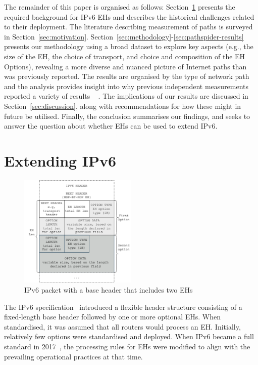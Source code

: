 \documentclass[conference]{IEEEtran}
\begin{document}
The remainder of this paper is organised as follows:
Section~\ref{sec:background} presents the required background for IPv6 EHs and
describes the historical challenges related to their deployment.  The
literature describing measurement of paths is surveyed in
Section~\ref{sec:motivation}.
Section~\ref{sec:methodology}-\ref{sec:pathspider-results} presents our
methodology using a broad dataset to explore key aspects (e.g., the size of the
EH, the choice of transport, and choice and composition of the EH Options),
revealing a more diverse and nuanced picture of Internet paths than was
previously reported. The results are organised by the type of network path and
the analysis provides insight into why previous independent measurements
reported a variety of results ~\cite{RFC7872} \cite{apnic}
\cite{nalini-iepg114} \cite{james}.  The implications of our results are
discussed in Section~\ref{sec:discussion}, along with recommendations for how
these might in future be utilised.  Finally, the conclusion summarises our
findings, and seeks to answer the question about whether EHs can be used to
extend IPv6.


\section{Extending IPv6}
\label{sec:background}


\label{sec:ipv6-option-deployment}

\begin{figure}
\centering
  \includegraphics[width=0.5\textwidth]{ehformat.png}
  \caption{IPv6 packet with a base header that includes two EHs}
  \label{fig:eh-format}
\end{figure}

The IPv6 specification~\cite{rfc2460} introduced a flexible header structure
consisting of a fixed-length base header followed by one or more optional EHs.
When standardised, it was assumed that all routers would process an EH.
Initially, relatively few options were standardised and deployed.  When IPv6
became a full standard in 2017~\cite{RFC8200}, the processing rules for EHs were
modified to align with the prevailing operational practices at that time.
\end{document}
